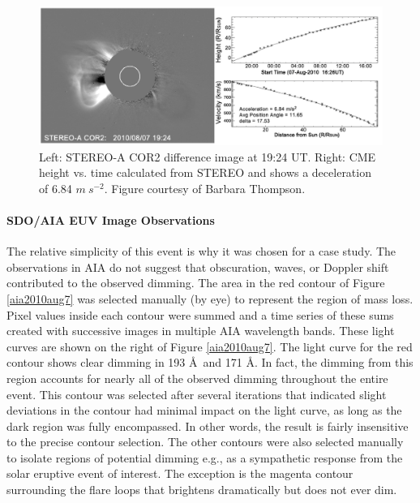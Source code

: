 \begin{figure}[!h]
    \begin{center}
	    \includegraphics[width=150mm]{Images/Stereo2010Aug7Cme.png}
    \end{center}
    \caption[LASCO coronagraph data for 2010 August 7 event]{
        Left: STEREO-A COR2 difference image at 19:24 UT. Right: CME height vs. time calculated from STEREO and shows a 
        deceleration of 6.84 $m\ s^{-2}$. Figure courtesy of Barbara Thompson. 
	}
    \label{stereo2010aug7}
\end{figure}

\paragraph{SDO/AIA EUV Image Observations}
The relative simplicity of this event is why it was chosen for a case study. The observations in AIA do not suggest that obscuration, waves, or Doppler shift contributed to the observed dimming. The area in the red contour of Figure \ref{aia2010aug7} was selected manually (by eye) to represent the region of mass loss. Pixel values inside each contour were summed and a time series of these sums created with successive images in multiple AIA wavelength bands. These light curves are shown on the right of Figure \ref{aia2010aug7}. The light curve for the red contour shows clear dimming in 193 \AA\ and 171 \AA. In fact, the dimming from this region accounts for nearly all of the observed dimming throughout the entire event. This contour was selected after several iterations that indicated slight deviations in the contour had minimal impact on the light curve, as long as the dark region was fully encompassed. In other words, the result is fairly insensitive to the precise contour selection. The other contours were also selected manually to isolate regions of potential dimming e.g., as a sympathetic response from the solar eruptive event of interest. The exception is the magenta contour surrounding the flare loops that brightens dramatically but does not ever dim. 

